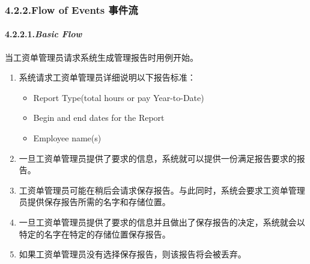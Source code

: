 \documentclass{article}
\begin{document}
\subsubsection{4.2.2.\hspace*{0.5em}Flow of Events 事件流}\label{sec-flow-of-events-}%

\paragraph{4.2.2.1.\hspace*{0.5em}\emph{Basic Flow}}\label{sec-_basic-flow_}%

\noindent{}\mdbr
{}当工资单管理员请求系统生成管理报告时用例开始。%

\begin{enumerate}%

\item{}
系统请求工资单管理员详细说明以下报告标准：%

\begin{itemize}[noitemsep,topsep=\mdcompacttopsep]%

\item{}Report Type(total hours or pay Year-to-Date)%

\item{}Begin and end dates for the Report%

\item{}Employee name(s)%
\end{itemize}%

\item{}
一旦工资单管理员提供了要求的信息，系统就可以提供一份满足报告要求的报告。%

\item{}
工资单管理员可能在稍后会请求保存报告。与此同时，系统会要求工资单管理员提供保存报告所需的名字和存储位置。%

\item{}
一旦工资单管理员提供了要求的信息并且做出了保存报告的决定，系统就会以特定的名字在特定的存储位置保存报告。%

\item{}
如果工资单管理员没有选择保存报告，则该报告将会被丢弃。%
\end{enumerate}%
\end{document}
